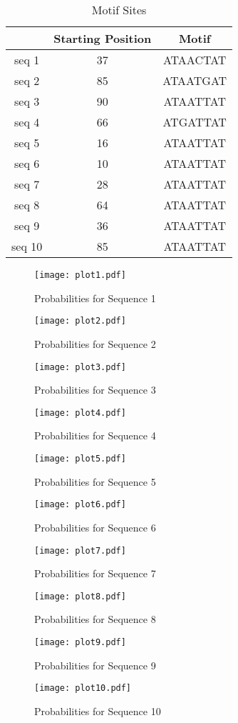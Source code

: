 \documentclass{acm_proc_article-sp}
\begin{document}
\begin{table}
\caption{Motif Sites}
\label{posmat}
\begin{tabular}{|c|c|c|} \hline
&Starting Position& Motif  \\ \hline
seq 1 &37& ATAACTAT \\ \hline
seq 2 &85 &ATAATGAT \\ \hline
seq 3 &90 &ATAATTAT \\ \hline
seq 4 &66 &ATGATTAT \\ \hline
seq 5 &16 &ATAATTAT \\ \hline
seq 6 &10 &ATAATTAT \\ \hline
seq 7 &28 &ATAATTAT \\ \hline
seq 8 &64 &ATAATTAT \\ \hline
seq 9 &36& ATAATTAT \\ \hline
seq 10& 85 &ATAATTAT \\ 
\hline\end{tabular}
\end{table}



\begin{figure}[t]
	\caption{Probabilities for Sequence 1}
	\texttt{[image: plot1.pdf]}
\end{figure}
\begin{figure}[t]
\caption{Probabilities for Sequence 2}
	\texttt{[image: plot2.pdf]}
\end{figure}
\begin{figure}[t]
\caption{Probabilities for Sequence 3}
	\texttt{[image: plot3.pdf]}
\end{figure}
\begin{figure}[t]
\caption{Probabilities for Sequence 4}
	\texttt{[image: plot4.pdf]}
\end{figure}
\begin{figure}[t]
\caption{Probabilities for Sequence 5}
	\texttt{[image: plot5.pdf]}
\end{figure}
\begin{figure}[t]
\caption{Probabilities for Sequence 6}
	\texttt{[image: plot6.pdf]}
\end{figure}
\begin{figure}[t]
\caption{Probabilities for Sequence 7}
	\texttt{[image: plot7.pdf]}
\end{figure}
\begin{figure}[t]
\caption{Probabilities for Sequence 8}
	\texttt{[image: plot8.pdf]}
\end{figure}
\begin{figure}[t]
\caption{Probabilities for Sequence 9}
	\texttt{[image: plot9.pdf]}
\end{figure}
\begin{figure}[t]
\caption{Probabilities for Sequence 10}
	\texttt{[image: plot10.pdf]}
\end{figure}
\end{document}
